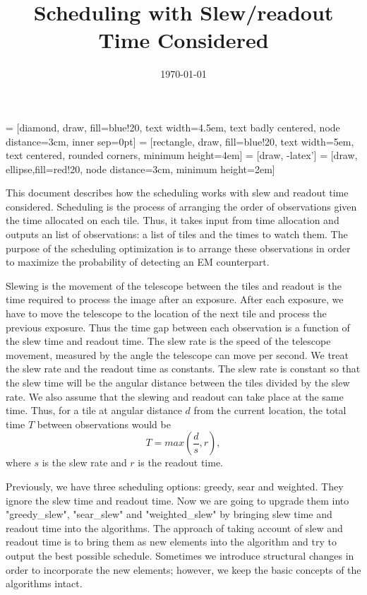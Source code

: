 \documentclass{article}
\title{Scheduling with Slew/readout Time Considered}
\date{\today}
\begin{document}
 = [diamond, draw, fill=blue!20, 
    text width=4.5em, text badly centered, node distance=3cm, inner sep=0pt]
 = [rectangle, draw, fill=blue!20, 
    text width=5em, text centered, rounded corners, minimum height=4em]
 = [draw, -latex']
 = [draw, ellipse,fill=red!20, node distance=3cm,
    minimum height=2em]
\maketitle
This document describes how the scheduling works with slew and readout time considered. Scheduling is the process of arranging the order of observations given the time allocated on each tile. Thus, it takes input from time allocation and outputs an list of observations: a list of tiles and the times to watch them. The purpose of the scheduling optimization is to arrange these observations in order to maximize the probability of detecting an EM counterpart. 

Slewing is the movement of the telescope between the tiles and readout is the time required to process the image after an exposure. After each exposure, we have to move the telescope to the location of the next tile and process the previous exposure. Thus the time gap between each observation is a function of the slew time and readout time. The slew rate is the speed of the telescope movement, measured by the angle the telescope can move per second. We treat the slew rate and the readout time as constants. The slew rate is constant so that the slew time will be the angular distance between the tiles divided by the slew rate. We also assume that the slewing and readout can take place at the same time. Thus, for a tile at angular distance $d$ from the current location, the total time $T$ between observations would be
\begin{equation}
T = max(\frac{d}{s}, r),
\end{equation}
where $s$ is the slew rate and $r$ is the readout time.

Previously, we have three scheduling options: greedy, sear and weighted. They ignore the slew time and readout time. Now we are going to upgrade them into "greedy\_slew", "sear\_slew" and "weighted\_slew" by bringing slew time and readout time into the algorithms. The approach of taking account of slew and readout time is to bring them as new elements into the algorithm and try to output the best possible schedule. Sometimes we introduce structural changes in order to incorporate the new elements; however, we keep the basic concepts of the algorithms intact. 
\end{document}
